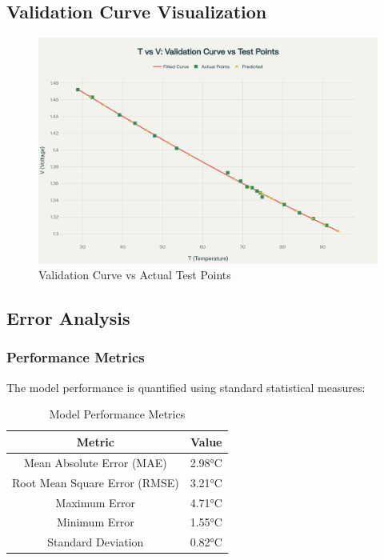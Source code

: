 \documentclass[journal]{IEEEtran}
\begin{document}
\subsection{\textbf{Validation Curve Visualization}}
\begin{figure}[H]
\centering
\includegraphics[width=0.85\linewidth]{fig/validation_chart .png}
\caption{Validation Curve vs Actual Test Points}
\label{fig:validation}
\end{figure}


\subsection{\textbf{Error Analysis}}

\subsubsection{\textbf{Performance Metrics}}

The model performance is quantified using standard statistical measures:

\begin{table}[H]
\centering
\begin{tabular}{|c|c|}
\hline
\textbf{Metric} & \textbf{Value} \\
\hline
Mean Absolute Error (MAE) & 2.98°C \\
Root Mean Square Error (RMSE) & 3.21°C \\
Maximum Error & 4.71°C \\
Minimum Error & 1.55°C \\
Standard Deviation & 0.82°C \\
\hline
\end{tabular}
\caption{Model Performance Metrics}
\end{table}
\end{document}
